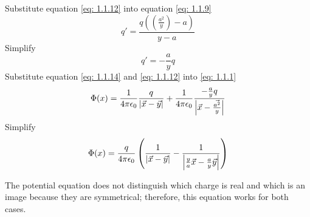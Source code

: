 \documentclass[12pt]{article}
\begin{document}
    Substitute equation \ref{eq: 1.1.12} into equation \ref{eq: 1.1.9}
    \begin{equation} \label{eq: 1.1.13}
        q' = \frac{q ((\frac{a^2}{y}) - a)}{y-a}
    \end{equation}
    Simplify
    \begin{equation} \label{eq: 1.1.14}
        q' = -\frac{a}{y} q
    \end{equation}
    Substitute equation \ref{eq: 1.1.14} and \ref{eq: 1.1.12} into \ref{eq: 1.1.1}
    \begin{equation} \label{1.1.15}
        \Phi(x) = \frac{1}{4 \pi \epsilon_0} \frac{q}{\abs{\vec{x}-\vec{y}}} + \frac{1}{4 \pi \epsilon_0} \frac{-\frac{a}{y} q}{\abs{\vec{x} - \vec{\frac{a^2}{y}}}}
    \end{equation}
    Simplify
    \begin{equation} \label{eq: 1.1.16}
        \Phi(x) = \frac{q}{4 \pi \epsilon_0} \left(\frac{1}{\abs{\vec{x}-\vec{y}}} - \frac{1}{\abs{\frac{y}{a} \vec{x} - \frac{a}{y} \vec{y}}} \right)
    \end{equation}

    The potential equation does not distinguish which charge is real and which is an image because they are symmetrical; therefore, this equation works for both cases.
\end{document}

